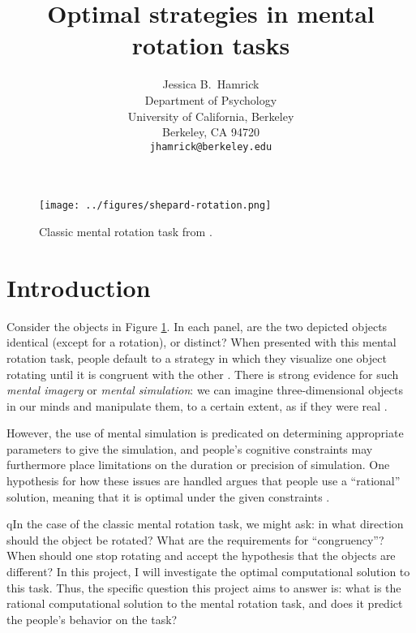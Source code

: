 \documentclass{article} %
\title{Optimal strategies in mental rotation tasks}
\author{Jessica B.~Hamrick\\
  Department of Psychology\\
  University of California, Berkeley\\
  Berkeley, CA 94720\\
  \texttt{jhamrick@berkeley.edu}}
\begin{document}
\maketitle

\begin{figure}[h]
  \begin{center}
    \texttt{[image: ../figures/shepard-rotation.png]}
  \end{center}
  \caption{Classic mental rotation task from \cite{Shepard1971}.}
  \label{fig:mental-rotation}
\end{figure}

\section{Introduction}


Consider the objects in Figure \ref{fig:mental-rotation}. In each
panel, are the two depicted objects identical (except for a rotation),
or distinct? When presented with this mental rotation task, people
default to a strategy in which they visualize one object rotating
until it is congruent with the other \cite{Shepard1971}. There is
strong evidence for such \textit{mental imagery} or \textit{mental
  simulation}: we can imagine three-dimensional objects in our minds
and manipulate them, to a certain extent, as if they were real
\cite{Kosslyn:2009tj}.

However, the use of mental simulation is predicated on determining
appropriate parameters to give the simulation, and people's cognitive
constraints may furthermore place limitations on the duration or
precision of simulation. One hypothesis for how these issues are
handled argues that people use a ``rational'' solution, meaning that
it is optimal under the given constraints
\cite{Lieder:2012wg,Vul:2009wy,Griffiths2012a}.

qIn the case of the classic mental rotation task, we might ask: in what
direction should the object be rotated?  What are the requirements for
``congruency''? When should one stop rotating and accept the
hypothesis that the objects are different? In this project, I will
investigate the optimal computational solution to this task. Thus, the
specific question this project aims to answer is: what is the rational
computational solution to the mental rotation task, and does it
predict the people's behavior on the task?
\end{document}
